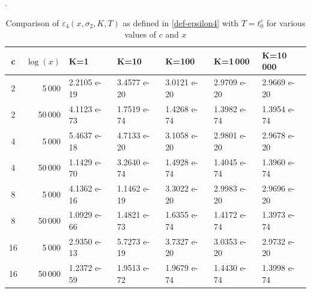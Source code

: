 \documentclass[10pt]{amsart}
\newcommand{\s}{\sigma}
\theoremstyle{definition}
\numberwithin{equation}{section}
\begin{document}
\begin{table}
\caption{Comparison of $\varepsilon_4(x,\s_2,K,T)$ as defined in \eqref{def-epsilon4} with $T=t_0^c$ for various values of $c$ and $x$}\label{table:epsilon4}.
{
\begin{tabular}{|c|r|lllll|}
\hline
c & $\log (x)$ &  K=1 & K=10 & K=100  & K=1\,000 & K=10\,000 \\
\hline
2 & 5\,000 & 2.2105 e-19 & 3.4577 e-20 & 3.0121 e-20 & 2.9709 e-20 & 2.9669 e-20  \\
2 & 50\,000 & 4.1123 e-73 & 1.7519 e-74 & 1.4268 e-74 & 1.3982 e-74 & 1.3954 e-74  \\
\hline
4 & 5\,000 & 5.4637 e-18 & 4.7133 e-20 & 3.1058 e-20 & 2.9801 e-20 & 2.9678 e-20  \\
4 & 50\,000 & 1.1429 e-70 & 3.2640 e-74 & 1.4928 e-74 & 1.4045 e-74 & 1.3960 e-74  \\
\hline
8 & 5\,000 & 4.1362 e-16 & 1.1462 e-19 & 3.3022 e-20 & 2.9983 e-20 & 2.9696 e-20  \\
8 & 50\,000 & 1.0929 e-66 & 1.4821 e-73 & 1.6355 e-74 & 1.4172 e-74 & 1.3973 e-74  \\
\hline
16 & 5\,000 & 2.9350 e-13 & 5.7273 e-19 & 3.7327 e-20 & 3.0353 e-20 & 2.9732 e-20  \\
16 & 50\,000 & 1.2372 e-59 & 1.9513 e-72 & 1.9679 e-74 & 1.4430 e-74 & 1.3998 e-74  \\
\hline
\end{tabular}
}

\end{table}
\end{document}
